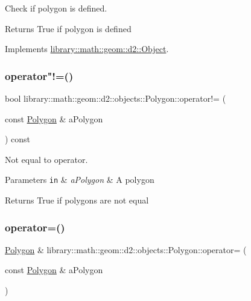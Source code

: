 Check if polygon is defined. 

\begin{DoxyReturn}{Returns}
True if polygon is defined 
\end{DoxyReturn}


Implements \hyperlink{classlibrary_1_1math_1_1geom_1_1d2_1_1_object_ae9506254971168a3ca63e1923556b70d}{library\+::math\+::geom\+::d2\+::\+Object}.

\mbox{\label{classlibrary_1_1math_1_1geom_1_1d2_1_1objects_1_1_polygon_a904fe22c8a690a6b5eb4f8746602d637}} 
\subsubsection{\texorpdfstring{operator"!=()}{operator!=()}}
{\footnotesize\ttfamily bool library\+::math\+::geom\+::d2\+::objects\+::\+Polygon\+::operator!= (\begin{DoxyParamCaption}\item[{const \hyperlink{classlibrary_1_1math_1_1geom_1_1d2_1_1objects_1_1_polygon}{Polygon} \&}]{a\+Polygon }\end{DoxyParamCaption}) const}



Not equal to operator. 


\begin{DoxyParams}[1]{Parameters}
\mbox{\tt in}  & {\em a\+Polygon} & A polygon \\
\hline
\end{DoxyParams}
\begin{DoxyReturn}{Returns}
True if polygons are not equal 
\end{DoxyReturn}
\mbox{\label{classlibrary_1_1math_1_1geom_1_1d2_1_1objects_1_1_polygon_afd72b5c2aa958835958d197ee57c3152}} 
\subsubsection{\texorpdfstring{operator=()}{operator=()}}
{\footnotesize\ttfamily \hyperlink{classlibrary_1_1math_1_1geom_1_1d2_1_1objects_1_1_polygon}{Polygon} \& library\+::math\+::geom\+::d2\+::objects\+::\+Polygon\+::operator= (\begin{DoxyParamCaption}\item[{const \hyperlink{classlibrary_1_1math_1_1geom_1_1d2_1_1objects_1_1_polygon}{Polygon} \&}]{a\+Polygon }\end{DoxyParamCaption})}



